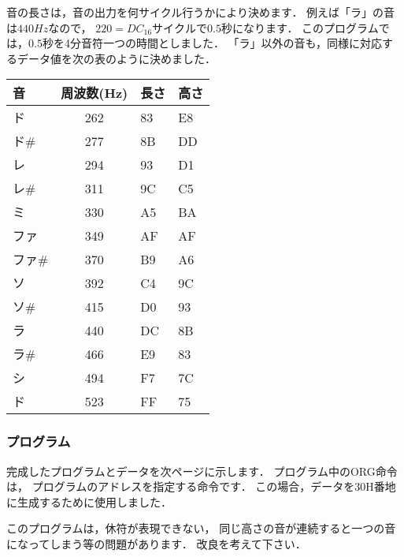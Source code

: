 音の長さは，音の出力を何サイクル行うかにより決めます．
例えば「ラ」の音は$440Hz$なので，
$220=DC_{16}サイクル$で$0.5秒$になります．
このプログラムでは，$0.5秒$を4分音符一つの時間としました．
「ラ」以外の音も，同様に対応するデータ値を次の表のように決めました．

{\footnotesize
\begin{center}
\begin{tabular}{| l | c | l | l |}
\hline
音      & 周波数(Hz) & 長さ & 高さ \\
\hline
ド      & 262 & 83 & E8 \\
ド\#    & 277 & 8B & DD \\
レ      & 294 & 93 & D1 \\
レ\#    & 311 & 9C & C5 \\
ミ      & 330 & A5 & BA \\
ファ    & 349 & AF & AF \\
ファ\#  & 370& B9 & A6 \\
ソ      & 392 & C4 & 9C \\
ソ\#    & 415 & D0 & 93 \\
ラ      & 440 & DC & 8B \\
ラ\#    & 466 & E9 & 83 \\
シ      & 494 & F7 & 7C \\
ド      & 523 & FF & 75 \\
\hline
\end{tabular}
\end{center}
}


\subsubsection{プログラム}

完成したプログラムとデータを次ページに示します．
プログラム中のORG命令は，
プログラムのアドレスを指定する命令です．
この場合，データを30H番地に生成するために使用しました．

このプログラムは，休符が表現できない，
同じ高さの音が連続すると一つの音になってしまう等の問題があります．
改良を考えて下さい．

